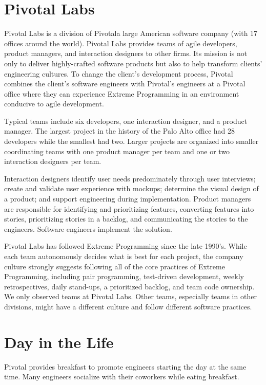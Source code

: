 \section{Pivotal Labs}
Pivotal Labs is a division of Pivotal\textemdash a large American software company (with 17 offices around the world). Pivotal Labs provides teams of agile developers, product managers, and interaction designers to other firms. Its mission is not only to deliver highly-crafted software products but also to help transform clients' engineering cultures. To change the client's development process, Pivotal combines the client's software engineers with Pivotal's engineers at a Pivotal office where they can experience Extreme Programming \cite{BeckExtremeProgramming2004} in an environment conducive to agile development. 


Typical teams include six developers, one interaction designer, and a product manager. The largest project in the history of the Palo Alto office had 28 developers while the smallest had two. Larger projects are organized into smaller coordinating teams with one product manager per team and one or two interaction designers per team.


Interaction designers identify user needs predominately through user interviews; create and validate user experience with mockups; determine the visual design of a product; and support engineering during implementation. Product managers are responsible for identifying and prioritizing features, converting features into stories, prioritizing stories in a backlog, and communicating the stories to the engineers. Software engineers implement the solution. 


Pivotal Labs has followed Extreme Programming \cite{BeckExtremeProgramming2004} since the late 1990's. While each team autonomously decides what is best for each project, the company culture strongly suggests following all of the core practices of Extreme Programming, including pair programming, test-driven development, weekly retrospectives, daily stand-ups, a prioritized backlog, and team code ownership. We only observed teams at Pivotal Labs. Other teams, especially teams in other divisions, might have a different culture and follow different software practices.


\section{Day in the Life}
Pivotal provides breakfast to promote engineers starting the day at the same time. Many engineers socialize with their coworkers while eating breakfast. 



